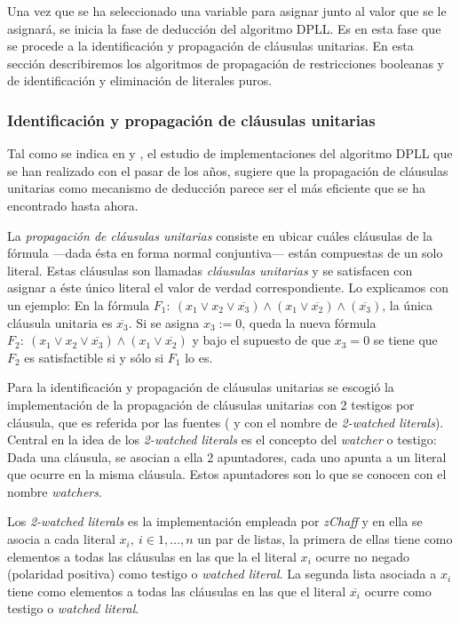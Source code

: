 \documentclass[12pt,lettersize,oneside]{article}
\begin{document}
Una vez que se ha seleccionado una variable para asignar junto al valor que se
le asignará, se inicia la fase de deducción del algoritmo DPLL. Es en esta fase
que se procede a la identificación y propagación de cláusulas unitarias. En esta
sección describiremos los algoritmos de propagación de restricciones booleanas y
de identificación y eliminación de literales puros.


\subsubsection{Identificación y propagación de cláusulas
  unitarias}\label{UnitPropagation}
Tal como se indica en \cite{Zhang} y \cite{ZhangThesis}, el estudio de
implementaciones del algoritmo DPLL que se han realizado con el pasar de los
años, sugiere que la propagación de cláusulas unitarias como mecanismo de
deducción parece ser el más eficiente que se ha encontrado hasta ahora.

La \emph{propagación de cláusulas unitarias} consiste en ubicar cuáles cláusulas
de la fórmula ---dada ésta en forma normal conjuntiva--- están compuestas de un
solo literal. Estas cláusulas son llamadas \emph{cláusulas unitarias} y se
satisfacen con asignar a éste único literal el valor de verdad correspondiente.
Lo explicamos con un ejemplo: En la fórmula $F_1:\ (x_1 \vee x_2 \vee
\overline{x_3}) \wedge (x_1 \vee \overline{x_2}) \wedge (\overline{x_3})$, la
única cláusula unitaria es $\overline{x_3}$. Si se asigna $x_3:=0$, queda la
nueva fórmula $F_2:\ (x_1 \vee x_2 \vee \overline{x_3}) \wedge (x_1 \vee
\overline{x_2}) $ y bajo el supuesto de que $x_3=0$ se tiene que $F_2$ es
satisfactible si y sólo si $F_1$ lo es.

Para la identificación y propagación de cláusulas unitarias se escogió la
implementación de la propagación de cláusulas unitarias con 2 testigos por
cláusula, que es referida por las fuentes (\cite{Zhang} y \cite{ZhangThesis} con
el nombre de \emph{2-watched literals}). Central en la idea de los
\emph{2-watched literals} es el concepto del \emph{watcher} o testigo: Dada una
cláusula, se asocian a ella 2 apuntadores, cada uno apunta a un literal que
ocurre en la misma cláusula. Estos apuntadores son lo que se conocen con el
nombre \emph{watchers}.

Los \emph{2-watched literals} es la implementación empleada por \emph{zChaff} y 
en ella se asocia a cada literal $x_i,\ i\in{1,\ldots,n}$ un par de listas, la
primera de ellas tiene como elementos a todas las cláusulas en las que la el
literal $x_i$ ocurre no negado (polaridad positiva) como testigo o \emph{watched
  literal}. La segunda lista asociada a $x_i$ tiene como elementos a todas las
cláusulas en las que el literal $\overline{x_i}$ ocurre como testigo o
\emph{watched literal}.
\end{document}
